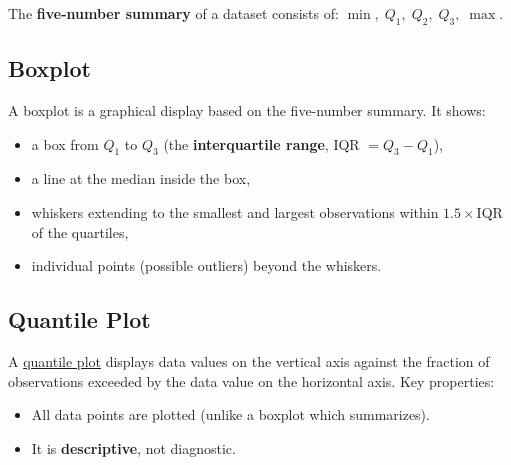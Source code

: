 \documentclass[10pt]{report}
\begin{document}
The \textbf{five-number summary} of a dataset consists of: $\min, \; Q_1, \; Q_2, \; Q_3, \; \max$.

\subsection{Boxplot}

A boxplot is a graphical display based on the five-number summary. It shows:
\begin{itemize}
  \item a box from $Q_1$ to $Q_3$ (the \textbf{interquartile range}, IQR $= Q_3 - Q_1$),
  \item a line at the median inside the box,
  \item whiskers extending to the smallest and largest observations within $1.5 \times \text{IQR}$ of the quartiles,
  \item individual points (possible outliers) beyond the whiskers.
\end{itemize}

\begin{center}
\end{center}

\subsection{Quantile Plot}

A \underline{quantile plot} displays data values on the vertical axis against the fraction of observations exceeded by the data value on the horizontal axis. Key properties:
\begin{itemize}
  \item All data points are plotted (unlike a boxplot which summarizes).
  \item It is \textbf{descriptive}, not diagnostic.
\end{itemize}
\end{document}
